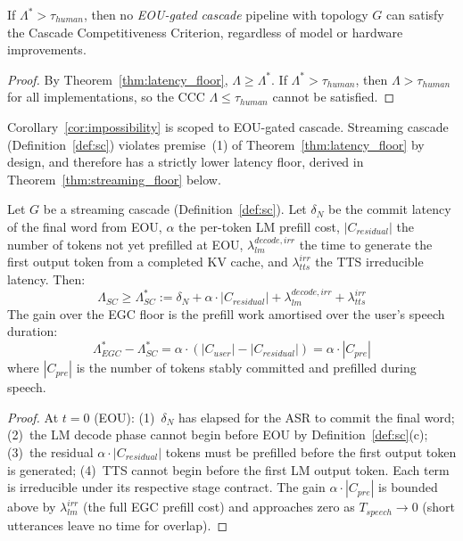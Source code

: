 \begin{corollary}
\label{cor:impossibility}
If $\Lambda^* > \tau_{human}$, then no \emph{EOU-gated cascade} pipeline with topology $G$
can satisfy the Cascade Competitiveness Criterion, regardless of model or hardware improvements.
\end{corollary}

\begin{proof}
By Theorem~\ref{thm:latency_floor}, $\Lambda \geq \Lambda^*$.
If $\Lambda^* > \tau_{human}$, then $\Lambda > \tau_{human}$ for all implementations,
so the CCC $\Lambda \leq \tau_{human}$ cannot be satisfied.
\end{proof}

\begin{remark}
Corollary~\ref{cor:impossibility} is scoped to EOU-gated cascade.
Streaming cascade (Definition~\ref{def:sc}) violates premise~(1) of Theorem~\ref{thm:latency_floor}
by design, and therefore has a strictly lower latency floor, derived in Theorem~\ref{thm:streaming_floor} below.
\end{remark}

\begin{theorem}
\label{thm:streaming_floor}
Let $G$ be a streaming cascade (Definition~\ref{def:sc}).
Let $\delta_N$ be the commit latency of the final word from EOU,
$\alpha$ the per-token LM prefill cost,
$|C_{residual}|$ the number of tokens not yet prefilled at EOU,
$\lambda_{lm}^{decode,irr}$ the time to generate the first output token from a
completed KV cache, and $\lambda_{tts}^{irr}$ the TTS irreducible latency.
Then:
\begin{equation}
  \Lambda_{SC} \geq \Lambda^*_{SC}
    := \delta_N + \alpha \cdot |C_{residual}| + \lambda_{lm}^{decode,irr} + \lambda_{tts}^{irr}
\end{equation}
The gain over the EGC floor is the prefill work amortised over the user's speech duration:
\begin{equation}
  \Lambda^*_{EGC} - \Lambda^*_{SC}
    = \alpha \cdot (|C_{user}| - |C_{residual}|)
    = \alpha \cdot |C_{pre}|
\end{equation}
where $|C_{pre}|$ is the number of tokens stably committed and prefilled during speech.
\end{theorem}

\begin{proof}
At $t = 0$ (EOU): (1)~$\delta_N$ has elapsed for the ASR to commit the final word; (2)~the
LM decode phase cannot begin before EOU by Definition~\ref{def:sc}(c); (3)~the residual
$\alpha \cdot |C_{residual}|$ tokens must be prefilled before the first output token is generated;
(4)~TTS cannot begin before the first LM output token.
Each term is irreducible under its respective stage contract.
The gain $\alpha \cdot |C_{pre}|$ is bounded above by $\lambda_{lm}^{irr}$ (the full EGC
prefill cost) and approaches zero as $T_{speech} \to 0$ (short utterances leave no time for overlap).
\end{proof}


